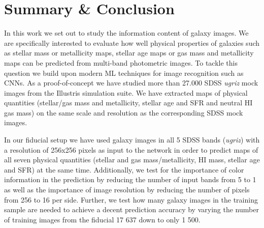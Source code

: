\documentclass[conference]{IEEEtran}
\begin{document}


\section{Summary \& Conclusion} 
\label{sec:concl}

In this work we set out to study the information content of galaxy images. We are specifically interested to evaluate how well physical properties of galaxies such as stellar mass or metallicity maps, stellar age maps or gas mass and metallicity maps can be predicted from multi-band photometric images. To tackle this question we build upon modern ML techniques for image recognition such as CNNs. As a proof-of-concept we have studied more than 27.000 SDSS \emph{ugriz} mock images from the Illustris simulation suite. We have extracted maps of physical quantities (stellar/gas mass and metallicity, stellar age and SFR and neutral HI gas mass) on the same scale and resolution as the corresponding SDSS mock images. 

In our fiducial setup we have used galaxy images in all 5 SDSS bands (\emph{ugriz}) with a resolution of 256x256 pixels as input to the network in order to predict maps of all seven physical quantities (stellar and gas mass/metallicity, HI mass, stellar age and SFR) at the same time. Additionally, we test for the importance of color information in the prediction by reducing the number of input bands from 5 to 1 as well as the importance of image resolution by reducing the number of pixels from 256 to 16 per side. Further, we test how many galaxy images in the training sample are needed to achieve a decent prediction accuracy by varying the number of training images from the fiducial 17 637 down to only 1 500. 
\end{document}
